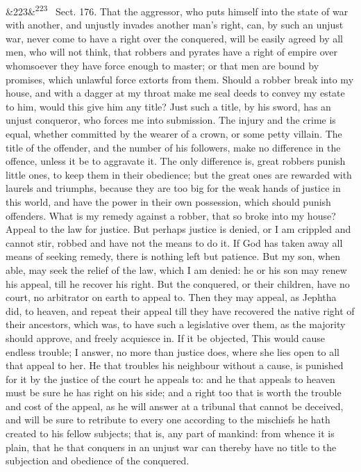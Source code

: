 \documentclass[12pt]{article}
\newcommand{\para}[1][]{\par\noindent\ifx&#1&\else\textsuperscript{\footnotesize #1}~\fi}
\begin{document}
\para[223] Sect. 176. That the aggressor, who puts himself into the state of war with another, and unjustly invades another man's right, can, by such an unjust war, never come to have a right over the conquered, will be easily agreed by all men, who will not think, that robbers and pyrates have a right of empire over whomsoever they have force enough to master; or that men are bound by promises, which unlawful force extorts from them. Should a robber break into my house, and with a dagger at my throat make me seal deeds to convey my estate to him, would this give him any title? Just such a title, by his sword, has an unjust conqueror, who forces me into submission. The injury and the crime is equal, whether committed by the wearer of a crown, or some petty villain. The title of the offender, and the number of his followers, make no difference in the offence, unless it be to aggravate it. The only difference is, great robbers punish little ones, to keep them in their obedience; but the great ones are rewarded with laurels and triumphs, because they are too big for the weak hands of justice in this world, and have the power in their own possession, which should punish offenders. What is my remedy against a robber, that so broke into my house? Appeal to the law for justice. But perhaps justice is denied, or I am crippled and cannot stir, robbed and have not the means to do it. If God has taken away all means of seeking remedy, there is nothing left but patience. But my son, when able, may seek the relief of the law, which I am denied: he or his son may renew his appeal, till he recover his right. But the conquered, or their children, have no court, no arbitrator on earth to appeal to. Then they may appeal, as Jephtha did, to heaven, and repeat their appeal till they have recovered the native right of their ancestors, which was, to have such a legislative over them, as the majority should approve, and freely acquiesce in. If it be objected, This would cause endless trouble; I answer, no more than justice does, where she lies open to all that appeal to her. He that troubles his neighbour without a cause, is punished for it by the justice of the court he appeals to: and he that appeals to heaven must be sure he has right on his side; and a right too that is worth the trouble and cost of the appeal, as he will answer at a tribunal that cannot be deceived, and will be sure to retribute to every one according to the mischiefs he hath created to his fellow subjects; that is, any part of mankind: from whence it is plain, that he that conquers in an unjust war can thereby have no title to the subjection and obedience of the conquered.
\end{document}
